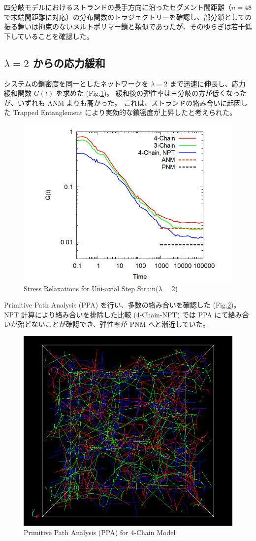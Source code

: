 \documentclass[uplatex,10pt,a4paper,twocolumn]{jsarticle}
\begin{document}
    四分岐モデルにおけるストランドの長手方向に沿ったセグメント間距離（$n=48$ で末端間距離に対応）の分布関数のトラジェクトリーを確認し、部分鎖としての振る舞いは拘束のないメルトポリマー鎖と類似であったが、そのゆらぎは若干低下していることを確認した。
    

    \subsection{$\lambda =2$ からの応力緩和}
    システムの鎖密度を同一としたネットワークを $\lambda =2$ まで迅速に伸長し、応力緩和関数 $G(t)$ を求めた (Fig.\ref{fig:stress_rel})。
    緩和後の弾性率は三分岐の方が低くなったが、いずれも ANM よりも高かった。
    これは、ストランドの絡み合いに起因した Trapped Entanglement により実効的な鎖密度が上昇したと考えられた。

    \begin{figure}[htb]
    \centering
        \includegraphics[width=.42\textwidth]{gt_comp_34.png}
    \caption{Stress Relaxations for Uni-axial Step Strain($\lambda=2$)}
    \label{fig:stress_rel}
    \end{figure}

    Primitive Path Analysis (PPA) を行い、多数の絡み合いを確認した (Fig.\ref{fig:ppa})。
    NPT 計算により絡み合いを排除した比較 (4-Chain-NPT) では PPA にて絡み合いが殆どないことが確認でき、弾性率が PNM へと漸近していた。
    
    \begin{figure}[htb]
    \centering
        \includegraphics[width=.34\textwidth]{N48_f4_PPA.png}
    \caption{Primitive Path Analysis (PPA) for 4-Chain Model}
    \label{fig:ppa}
    \end{figure}
\end{document}
